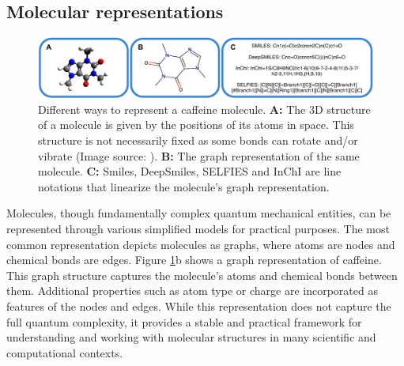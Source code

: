 \subsection{Molecular representations}
\begin{figure}
      \centering
      \includegraphics[width=\textwidth]{figures/representations/representations.pdf}
      \caption{Different ways to represent a caffeine molecule. \textbf{A:} The 3D structure of a
            molecule is given by the positions of its atoms in space. This structure is not
            necessarily fixed as some bonds can rotate and/or vibrate (Image source:
            \citep{Caffeine3DStructure2010}). \textbf{B:} The graph representation of the same
            molecule. \textbf{C:} Smiles, DeepSmiles, SELFIES and InChI are line notations that
            linearize the molecule's graph representation.\label{fig:molecular-graph}}
\end{figure}
Molecules, though fundamentally complex quantum mechanical entities, can be represented through
various simplified models for practical purposes. The most common representation depicts molecules
as graphs, where atoms are nodes and chemical bonds are edges. Figure \ref{fig:molecular-graph}b
shows a graph representation of caffeine. This graph structure captures the molecule's atoms
and chemical bonds between them. Additional properties such as atom type or charge are
incorporated as features of the nodes and edges. While this representation does not capture the full
quantum complexity, it provides a stable and practical framework for understanding and working with
molecular structures in many scientific and computational contexts.

